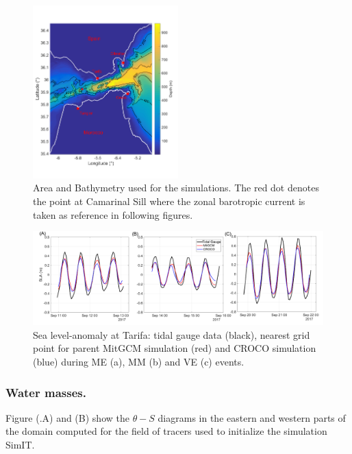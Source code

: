 \begin{figure}[!h]
        \centering
        \includegraphics[width=0.5\textwidth]{./GBR3D/FigBathyVHR.png}
        \caption{Area and Bathymetry used for the simulations. The red dot denotes the point at Camarinal Sill where the zonal barotropic current is taken as reference in following figures.}
        \label{FigBathy3D}
\end{figure}

\begin{figure}[!h]
        \includegraphics[width=\textwidth]{./GBR3D/SLA_Tarifa_ME2VE2IES.png}
        \caption{Sea level-anomaly at Tarifa: tidal gauge data (black), nearest grid point for parent MitGCM simulation (red) and CROCO simulation (blue) during ME (a), MM (b) and VE (c) events.}
        \label{fig_maree_tar}
\end{figure}

\subsubsection{Water masses.}
\label{sectionWaterMasses}
Figure (.A) and (B) show the $\theta-S$ diagrams in the eastern and western parts of the domain computed for the field of tracers used to initialize the simulation SimIT. 

